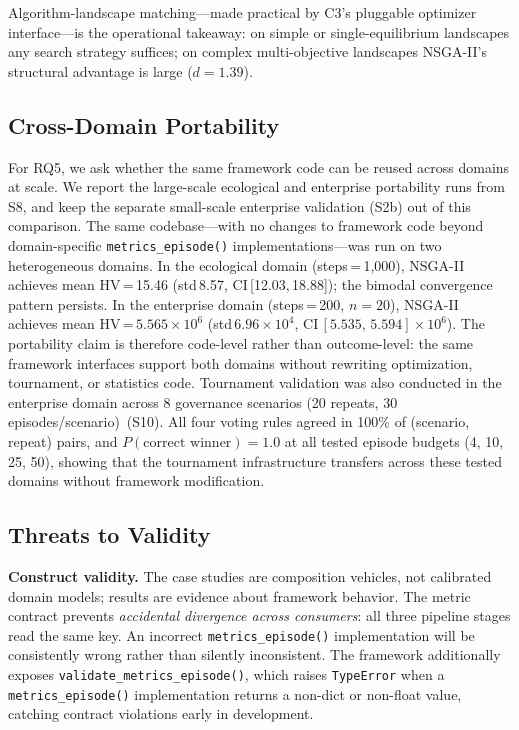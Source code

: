 \documentclass{wscpaperproc}
\begin{document}
Algorithm-landscape matching---made practical by C3's pluggable optimizer
interface---is the operational takeaway: on simple or single-equilibrium
landscapes any search strategy suffices; on complex multi-objective
landscapes NSGA-II's structural advantage is large ($d\!=\!1.39$).

\subsection{Cross-Domain Portability}
\label{sec:crossdomain}

For RQ5, we ask whether the same framework code can be
reused across domains at scale. We report the large-scale ecological and
enterprise portability runs from S8, and keep the separate small-scale
enterprise validation (S2b) out of this comparison. The same codebase---with no
changes to framework code beyond domain-specific \texttt{metrics\_episode()}
implementations---was run on two heterogeneous domains. In the ecological domain
(steps\,=\,1,000), NSGA-II achieves mean HV\,=\,15.46
(std\,8.57, CI\,[12.03,\,18.88]); the bimodal convergence pattern persists. In
the enterprise domain (steps\,=\,200, $n\!=\!20$), NSGA-II achieves mean
HV\,=\,$5.565\!\times\!10^{6}$ (std\,$6.96\!\times\!10^{4}$,
CI\,$[5.535,\,5.594]\!\times\!10^{6}$). The portability claim is therefore
code-level rather than outcome-level: the same framework interfaces support both
domains without rewriting optimization, tournament, or statistics code.
Tournament validation was also conducted in the enterprise
domain across 8 governance scenarios (20 repeats, 30 episodes/scenario)~(S10).
All four voting rules agreed in 100\% of (scenario, repeat) pairs, and
$P(\text{correct winner})\!=\!1.0$ at all tested episode budgets (4, 10, 25,
50), showing that the tournament infrastructure transfers across these tested
domains without framework modification.

\subsection{Threats to Validity}

\textbf{Construct validity.} The case studies are composition vehicles, not
calibrated domain models; results are evidence about framework behavior. The
metric contract prevents \emph{accidental divergence across consumers}: all
three pipeline stages read the same key. An incorrect \texttt{metrics\_episode()}
implementation will be consistently wrong rather than silently inconsistent. The
framework additionally exposes \texttt{validate\_metrics\_episode()}, which raises
\texttt{TypeError} when a \texttt{metrics\_episode()} implementation returns a
non-dict or non-float value, catching contract violations early in development.
\end{document}
